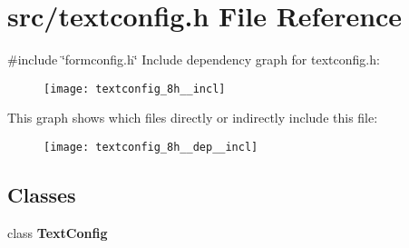 \section{src/textconfig.h File Reference}
\label{textconfig_8h}
{\ttfamily \#include \char`\"{}formconfig.\+h\char`\"{}}\newline
Include dependency graph for textconfig.\+h\+:\nopagebreak
\begin{figure}[H]
\begin{center}
\leavevmode
\texttt{[image: textconfig\_8h\_\_incl]}
\end{center}
\end{figure}
This graph shows which files directly or indirectly include this file\+:\nopagebreak
\begin{figure}[H]
\begin{center}
\leavevmode
\texttt{[image: textconfig\_8h\_\_dep\_\_incl]}
\end{center}
\end{figure}
\subsection*{Classes}
\begin{DoxyCompactItemize}
\item 
class \textbf{ Text\+Config}
\end{DoxyCompactItemize}
